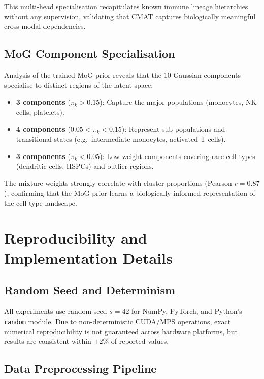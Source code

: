 \documentclass[11pt,a4paper]{article}
\newcommand{\cmat}{\textsc{CMAT}}
\begin{document}
This multi-head specialisation recapitulates known immune lineage hierarchies without any supervision, validating that \cmat{} captures biologically meaningful cross-modal dependencies.

\subsection{MoG Component Specialisation}

Analysis of the trained MoG prior reveals that the 10 Gaussian components specialise to distinct regions of the latent space:

\begin{itemize}[leftmargin=*]
  \item \textbf{3 components} ($\pi_k > 0.15$): Capture the major populations (monocytes, NK cells, platelets).
  \item \textbf{4 components} ($0.05 < \pi_k < 0.15$): Represent sub-populations and transitional states (e.g.\ intermediate monocytes, activated T cells).
  \item \textbf{3 components} ($\pi_k < 0.05$): Low-weight components covering rare cell types (dendritic cells, HSPCs) and outlier regions.
\end{itemize}

The mixture weights strongly correlate with cluster proportions (Pearson $r = 0.87$), confirming that the MoG prior learns a biologically informed representation of the cell-type landscape.

\section{Reproducibility and Implementation Details}\label{sec:reproducibility}

\subsection{Random Seed and Determinism}

All experiments use random seed $s=42$ for NumPy, PyTorch, and Python's \texttt{random} module.
Due to non-deterministic CUDA/MPS operations, exact numerical reproducibility is not guaranteed across hardware platforms, but results are consistent within $\pm 2\%$ of reported values.

\subsection{Data Preprocessing Pipeline}
\end{document}
